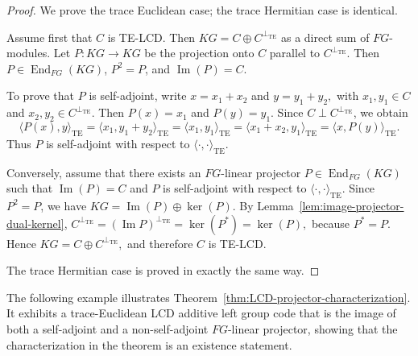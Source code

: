 \documentclass[11pt]{article}
\begin{document}
\begin{proof}
We prove the trace Euclidean case; the trace Hermitian case is identical.

Assume first that $C$ is TE-LCD. Then
$
KG=C\oplus C^{\perp_{\mathrm{TE}}}
$
as a direct sum of $FG$-modules. Let $P:KG\longrightarrow KG$ be the projection onto $C$ parallel to $C^{\perp_{\mathrm{TE}}}$. Then $P\in \operatorname{End}_{FG}(KG)$, $P^2=P$, and $\operatorname{Im}(P)=C$.

To prove that $P$ is self-adjoint, write
$
x=x_1+x_2
$
and
$
y=y_1+y_2,
$
with $x_1,y_1\in C$ and $x_2,y_2\in C^{\perp_{\mathrm{TE}}}$. Then $P(x)=x_1$ and $P(y)=y_1$. Since $C\perp C^{\perp_{\mathrm{TE}}}$, we obtain
$$
\langle P(x),y\rangle_{\mathrm{TE}}
=
\langle x_1,y_1+y_2\rangle_{\mathrm{TE}}
=
\langle x_1,y_1\rangle_{\mathrm{TE}}
=
\langle x_1+x_2,y_1\rangle_{\mathrm{TE}}
=
\langle x,P(y)\rangle_{\mathrm{TE}}.
$$
Thus $P$ is self-adjoint with respect to $\langle\cdot,\cdot\rangle_{\mathrm{TE}}$.

Conversely, assume that there exists an $FG$-linear projector $P\in \operatorname{End}_{FG}(KG)$ such that $\operatorname{Im}(P)=C$ and $P$ is self-adjoint with respect to $\langle\cdot,\cdot\rangle_{\mathrm{TE}}$. Since $P^2=P$, we have
$
KG=\operatorname{Im}(P)\oplus\ker(P).
$
By Lemma~\ref{lem:image-projector-dual-kernel},
$
C^{\perp_{\mathrm{TE}}}=(\operatorname{Im}P)^{\perp_{\mathrm{TE}}}=\ker(P^\ast)=\ker(P),
$
because $P^\ast=P$. Hence
$
KG=C\oplus C^{\perp_{\mathrm{TE}}},
$
and therefore $C$ is TE-LCD.

The trace Hermitian case is proved in exactly the same way.
\end{proof}
The following example illustrates
Theorem~\ref{thm:LCD-projector-characterization}. It exhibits a
trace-Euclidean LCD additive left group code that is the image of both a
self-adjoint and a non-self-adjoint $FG$-linear projector, showing that the
characterization in the theorem is an existence statement.
\end{document}
